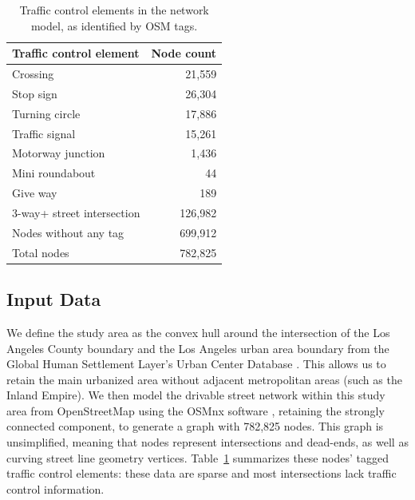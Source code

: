 \documentclass[12pt,letterpaper]{article} %
\begin{document}
    \begin{table}[hbt!]
        \centering
        \caption{Traffic control elements in the network model, as identified by OSM tags.}\label{tab:node_count}
        \begin{tabular}{lr}
            \toprule
            Traffic control element    & Node count \\ \midrule
            Crossing                   &     21,559 \\
            Stop sign                  &     26,304 \\
            Turning circle             &     17,886 \\
            Traffic signal             &     15,261 \\
            Motorway junction          &      1,436 \\
            Mini roundabout            &         44 \\
            Give way                   &        189 \\
            3-way+ street intersection &    126,982 \\
            Nodes without any tag      &    699,912 \\
            Total nodes                &    782,825 \\ \bottomrule
        \end{tabular}
    \end{table}

    \subsection{Input Data}

    We define the study area as the convex hull around the intersection of the Los Angeles County boundary and the Los Angeles urban area boundary from the Global Human Settlement Layer's Urban Center Database \citep{florczyk2019description, GHS2019}. This allows us to retain the main urbanized area without adjacent metropolitan areas (such as the Inland Empire). We then model the drivable street network within this study area from OpenStreetMap using the OSMnx software \citep{boeing2017osmnx}, retaining the strongly connected component, to generate a graph with 782,825 nodes. This graph is unsimplified, meaning that nodes represent intersections and dead-ends, as well as curving street line geometry vertices. Table~\ref{tab:node_count} summarizes these nodes' tagged traffic control elements: these data are sparse and most intersections lack traffic control information.
\end{document}
